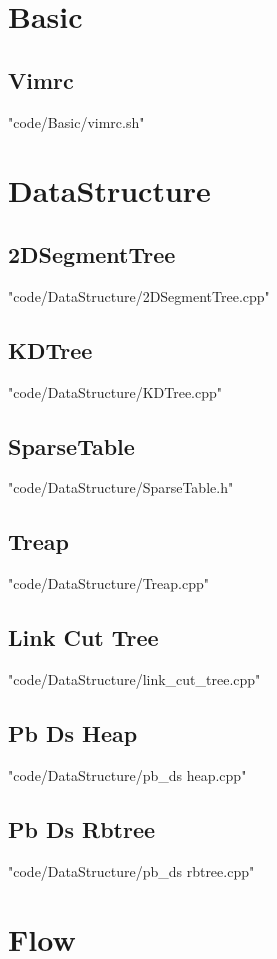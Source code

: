 


\section{Basic}
\subsection{Vimrc}
 {"code/Basic/vimrc.sh"}
\section{DataStructure}
\subsection{2DSegmentTree}
 {"code/DataStructure/2DSegmentTree.cpp"}
\subsection{KDTree}
 {"code/DataStructure/KDTree.cpp"}
\subsection{SparseTable}
 {"code/DataStructure/SparseTable.h"}
\subsection{Treap}
 {"code/DataStructure/Treap.cpp"}
\subsection{Link Cut Tree}
 {"code/DataStructure/link_cut_tree.cpp"}
\subsection{Pb Ds Heap}
 {"code/DataStructure/pb_ds heap.cpp"}
\subsection{Pb Ds Rbtree}
 {"code/DataStructure/pb_ds rbtree.cpp"}
\section{Flow}
